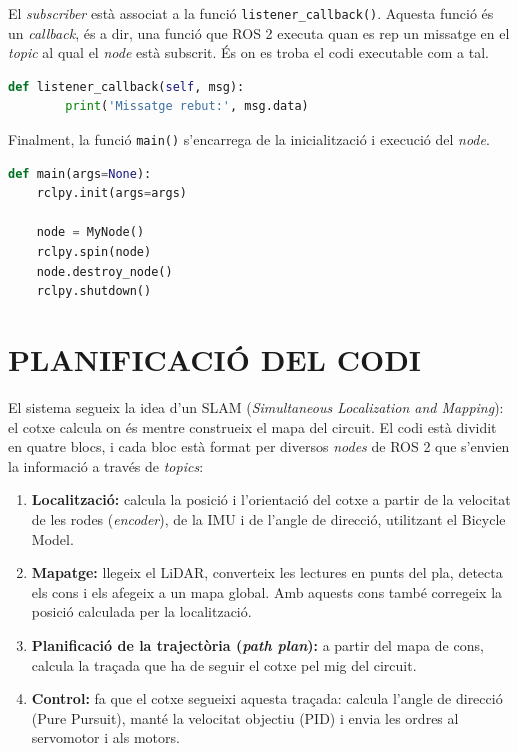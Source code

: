 \documentclass[11pt,a4paper]{article}
\let\origsection\section
\renewcommand{\section}{\clearpage\origsection}
\begin{document}
El \emph{subscriber} està associat a la funció \texttt{listener\_\allowbreak{}callback()}. Aquesta funció és un \emph{callback}, és a dir, una funció que ROS 2 executa quan es rep un missatge en el \emph{topic} al qual el \emph{node} està subscrit. És on es troba el codi executable com a tal.

\begin{lstlisting}[language=Python]
    def listener_callback(self, msg):
        print('Missatge rebut:', msg.data)
\end{lstlisting}

\newpage
Finalment, la funció \texttt{main()} s’encarrega de la inicialització i execució del \emph{node}.

\begin{lstlisting}[language=Python]
def main(args=None):
    rclpy.init(args=args)

    node = MyNode()
    rclpy.spin(node)
    node.destroy_node()
    rclpy.shutdown()
\end{lstlisting}

\section{PLANIFICACIÓ DEL CODI}

El sistema segueix la idea d’un SLAM (\emph{Simultaneous Localization and Mapping}): el cotxe calcula on és mentre construeix el mapa del circuit. El codi està dividit en quatre blocs, i cada bloc està format per diversos \emph{nodes} de ROS 2 que s’envien la informació a través de \emph{topics}:
\nopagebreak

\begin{enumerate}
  \item \textbf{Localització:} calcula la posició i l’orientació del cotxe a partir de la velocitat de les rodes (\emph{encoder}), de la IMU i de l’angle de direcció, utilitzant el Bicycle Model.
  \item \textbf{Mapatge:} llegeix el LiDAR, converteix les lectures en punts del pla, detecta els cons i els afegeix a un mapa global. Amb aquests cons també corregeix la posició calculada per la localització.
  \item \textbf{Planificació de la trajectòria (\emph{path plan}):} a partir del mapa de cons, calcula la traçada que ha de seguir el cotxe pel mig del circuit.
  \item \textbf{Control:} fa que el cotxe segueixi aquesta traçada: calcula l’angle de direcció (Pure Pursuit), manté la velocitat objectiu (PID) i envia les ordres al servomotor i als motors.
\end{enumerate}
\end{document}
